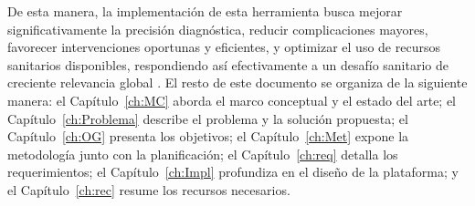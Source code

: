 De esta manera, la implementación de esta herramienta busca mejorar significativamente la precisión diagnóstica, reducir complicaciones mayores, favorecer intervenciones oportunas y eficientes, y optimizar el uso de recursos sanitarios disponibles, respondiendo así efectivamente a un desafío sanitario de creciente relevancia global \cite{organizacion2016informe}.
El resto de este documento se organiza de la siguiente manera: el Capítulo~\ref{ch:MC} aborda el marco conceptual y el estado del arte; el Capítulo~\ref{ch:Problema} describe el problema y la solución propuesta; el Capítulo~\ref{ch:OG} presenta los objetivos; el Capítulo~\ref{ch:Met} expone la metodología junto con la planificación; el Capítulo~\ref{ch:req} detalla los requerimientos; el Capítulo~\ref{ch:Impl} profundiza en el diseño de la plataforma; y el Capítulo~\ref{ch:rec} resume los recursos necesarios.
